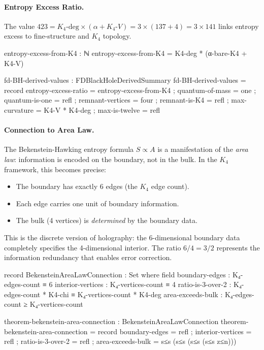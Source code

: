 \documentclass[11pt,a4paper]{book}
\begin{document}
\paragraph{Entropy Excess Ratio.}
The value $423 = K_4\text{-deg} \times (\alpha + K_4\text{-}V) = 3 \times (137 + 4) = 3 \times 141$
links entropy excess to fine-structure and $K_4$ topology.

\begin{code}
  entropy-excess-from-K4 : ℕ
  entropy-excess-from-K4 = K4-deg * (α-bare-K4 + K4-V)

  fd-BH-derived-values : FDBlackHoleDerivedSummary
  fd-BH-derived-values = record
    { entropy-excess-ratio = entropy-excess-from-K4
    ; quantum-of-mass = one
    ; quantum-is-one = refl
    ; remnant-vertices = four
    ; remnant-is-K4 = refl
    ; max-curvature = K4-V * K4-deg
    ; max-is-twelve = refl
    }
\end{code}

\paragraph{Connection to Area Law.}

The Bekenstein-Hawking entropy formula $S \propto A$ is a manifestation of the 
\emph{area law}: information is encoded on the boundary, not in the bulk. In 
the $K_4$ framework, this becomes precise:

\begin{itemize}
\item The boundary has exactly 6 edges (the $K_4$ edge count).
\item Each edge carries one unit of boundary information.
\item The bulk (4 vertices) is \emph{determined} by the boundary data.
\end{itemize}

This is the discrete version of holography: the 6-dimensional boundary data 
completely specifies the 4-dimensional interior. The ratio $6/4 = 3/2$ 
represents the information redundancy that enables error correction.

\begin{code}
record BekensteinAreaLawConnection : Set where
  field
    boundary-edges     : K₄-edges-count ≡ 6
    interior-vertices  : K₄-vertices-count ≡ 4
    ratio-is-3-over-2  : K₄-edges-count * K4-chi ≡ K₄-vertices-count * K4-deg
    area-exceeds-bulk  : K₄-edges-count ≥ K₄-vertices-count

theorem-bekenstein-area-connection : BekensteinAreaLawConnection
theorem-bekenstein-area-connection = record
  { boundary-edges = refl
  ; interior-vertices = refl
  ; ratio-is-3-over-2 = refl
  ; area-exceeds-bulk = s≤s (s≤s (s≤s (s≤s z≤n)))
  }
\end{code}
  
\end{document}
